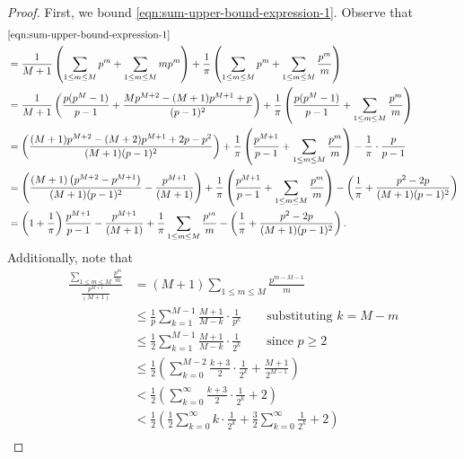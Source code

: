 \documentclass[11pt,letterpaper,reqno]{amsart}
\theoremstyle{definition}
\numberwithin{equation}{section}
\numberwithin{figure}{section}
\numberwithin{table}{section}
\begin{document}
\begin{proof}
First, we bound \eqref{eqn:sum-upper-bound-expression-1}. Observe that
\begin{align}
    & \eqref{eqn:sum-upper-bound-expression-1} \\
    &= \frac{1}{M + 1} \left(  \sum_{1 \leq m \leq M} p^m + \sum_{1 \leq m \leq M} mp^m\right) + \frac{1}{\pi} \left( \sum_{1 \leq m \leq M} p^m  + \sum_{1 \leq m \leq M} \frac{p^m}{m} \right)\\
    &= \frac{1}{M + 1} \left( \frac{p(p^M - 1)}{p -1} + \frac{M p^{M+ 2} - (M + 1)p^{M + 1} + p}{(p - 1)^2} \right) + \frac{1}{\pi} \left(\frac{p(p^M - 1)}{p -1}  + \sum_{1 \leq m \leq M} \frac{p^m}{m} \right)\\
    &=  \left(  \frac{(M + 1) p^{M+ 2} - (M + 2)p^{M + 1} + 2p - p^2}{(M + 1)(p - 1)^2} \right) + \frac{1}{\pi} \left( \frac{p^{M + 1}}{p - 1}  + \sum_{1 \leq m \leq M} \frac{p^m}{m} \right) - \frac{1}{\pi} \cdot \frac{p}{p - 1}\\
    &=  \left(  \frac{(M + 1) \left( p^{M + 2} - p^{M + 1} \right)}{(M + 1)(p - 1)^2} - \frac{p^{M + 1}}{(M + 1)} \right) + \frac{1}{\pi} \left(\frac{p^{M + 1}}{p - 1} + \sum_{1 \leq m \leq M} \frac{p^m}{m} \right) - \left( \frac{1}{\pi} + \frac{p^2 - 2p}{(M + 1)(p - 1)^2} \right)\\
    &=  \left( 1 + \frac{1}{\pi} \right) \frac{ p^{M + 1} }{p - 1} - \frac{p^{M + 1}}{(M + 1)}  + \frac{1}{\pi}  \sum_{1 \leq m \leq M} \frac{p^m}{m} - \left( \frac{1}{\pi} + \frac{p^2 - 2p}{(M + 1)(p - 1)^2} \right). \label{eqn:simplified---sum-upper-bound-expression-1}
\end{align}
Additionally, note that
\begin{align*}
    \frac{ \sum_{1 \leq m \leq M} \frac{p^m}{m}}{\frac{p^{M + 1}}{(M + 1)}} &= (M + 1) \sum_{1 \leq m \leq M} \frac{p^{m - M - 1}}{m} \\
    &\leq \frac{1}{p} \sum_{k = 1}^{M - 1} \frac{M + 1}{M - k} \cdot  \frac{1}{p^k} \qquad  \text{substituting $k = M - m$} \\
    &\leq \frac{1}{2} \sum_{k = 1}^{M - 1} \frac{M + 1}{M - k} \cdot  \frac{1}{2^k} \qquad \text{since $p \geq 2$} \\
    &\leq \frac{1}{2} \left( \sum_{k = 0}^{M - 2} \frac{k + 3}{2} \cdot \frac{1}{2^k}  +  \frac{M + 1}{2^{M - 1}} \right)\\
    &< \frac{1}{2} \left( \sum_{k = 0}^{\infty} \frac{k + 3}{2} \cdot \frac{1}{2^k} +  2 \right) \\
    &< \frac{1}{2} \left( \frac{1}{2}\sum_{k = 0}^{\infty} k \cdot \frac{1}{2^k} + \frac{3}{2} \sum_{k = 0}^{\infty} \frac{1}{2^k} +  2 \right) \\

\end{align*}
\end{proof}
\end{document}
